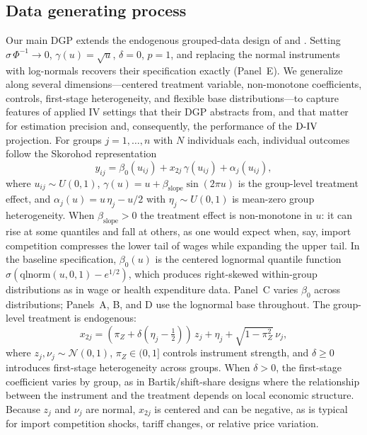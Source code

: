 \documentclass[12pt]{article}
\newcommand{\est}{\ensuremath{\textnormal{D-IV}}\xspace}
\begin{document}
\subsection{Data generating process}

Our main DGP extends the endogenous grouped-data design of \citet{chetverikov2016iv} and \citet{melly2025minimum}. Setting $\sigma\,\Phi^{-1} \to 0$, $\gamma(u) = \sqrt{u}$, $\delta = 0$, $p = 1$, and replacing the normal instruments with log-normals recovers their specification exactly (Panel~E). We generalize along several dimensions---centered treatment variable, non-monotone coefficients, controls, first-stage heterogeneity, and flexible base distributions---to capture features of applied IV settings that their DGP abstracts from, and that matter for estimation precision and, consequently, the performance of the \est projection. For groups $j = 1, \ldots, n$ with $N$ individuals each, individual outcomes follow the Skorohod representation
\begin{equation}\label{eq:dgp_sim}
y_{ij} = \beta_0(u_{ij}) + x_{2j}\, \gamma(u_{ij}) + \alpha_j(u_{ij}),
\end{equation}
where $u_{ij} \sim U(0,1)$, $\gamma(u) = u + \beta_{\text{slope}} \sin(2\pi u)$ is the group-level treatment effect, and $\alpha_j(u) = u\, \eta_j - u/2$ with $\eta_j \sim U(0,1)$ is mean-zero group heterogeneity. When $\beta_{\text{slope}} > 0$ the treatment effect is non-monotone in $u$: it can rise at some quantiles and fall at others, as one would expect when, say, import competition compresses the lower tail of wages while expanding the upper tail. In the baseline specification, $\beta_0(u)$ is the centered lognormal quantile function $\sigma(\text{qlnorm}(u, 0, 1) - e^{1/2})$, which produces right-skewed within-group distributions as in wage or health expenditure data. Panel~C varies $\beta_0$ across distributions; Panels~A, B, and D use the lognormal base throughout. The group-level treatment is endogenous:
\[
x_{2j} = (\pi_Z + \delta(\eta_j - \tfrac{1}{2}))\, z_j + \eta_j + \sqrt{1 - \pi_Z^2}\, \nu_j,
\]
where $z_j, \nu_j \sim \mathcal{N}(0,1)$, $\pi_Z \in (0,1]$ controls instrument strength, and $\delta \geq 0$ introduces first-stage heterogeneity across groups. When $\delta > 0$, the first-stage coefficient varies by group, as in Bartik/shift-share designs where the relationship between the instrument and the treatment depends on local economic structure. Because $z_j$ and $\nu_j$ are normal, $x_{2j}$ is centered and can be negative, as is typical for import competition shocks, tariff changes, or relative price variation.
\end{document}
